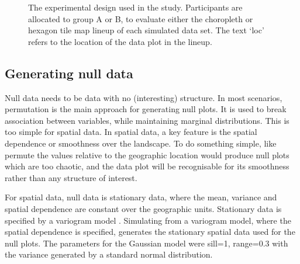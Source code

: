 \documentclass[
doublespace,
  times]{anzsauth}
\begin{document}
\begin{figure}


\caption{\label{fig-exp-design}The experimental design used in the
study. Participants are allocated to group A or B, to evaluate either
the choropleth or hexagon tile map lineup of each simulated data set.
The text `loc' refers to the location of the data plot in the lineup.}

\end{figure}%

\subsection{Generating null data}\label{generating-null-data}

Null data needs to be data with no (interesting) structure. In most
scenarios, permutation is the main approach for generating null plots.
It is used to break association between variables, while maintaining
marginal distributions. This is too simple for spatial data. In spatial
data, a key feature is the spatial dependence or smoothness over the
landscape. To do something simple, like permute the values relative to
the geographic location would produce null plots which are too chaotic,
and the data plot will be recognisable for its smoothness rather than
any structure of interest.

For spatial data, null data is stationary data, where the mean, variance
and spatial dependence are constant over the geographic units.
Stationary data is specified by a variogram model \citep{POG}.
Simulating from a variogram model, where the spatial dependence is
specified, generates the stationary spatial data used for the null
plots. The parameters for the Gaussian model were sill=1, range=0.3 with
the variance generated by a standard normal distribution.
\end{document}
